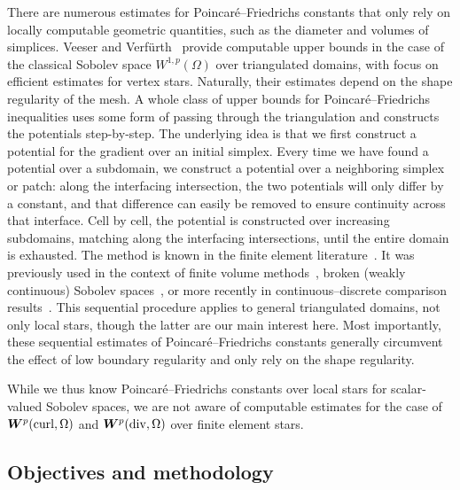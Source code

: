 \documentclass[10pt,a4paper]{article}
\begin{document}
There are numerous estimates for Poincar\'e--Friedrichs constants that only rely on locally computable geometric quantities, such as the diameter and volumes of simplices. 
Veeser and Verf\"urth~\cite{veeser2012poincare} provide computable upper bounds in the case of the classical Sobolev space $W^{1,p}(\Omega)$ over triangulated domains, with focus on efficient estimates for vertex stars. Naturally, their estimates depend on the shape regularity of the mesh.
A whole class of upper bounds for Poincar\'e--Friedrichs inequalities uses some form of passing through the triangulation and constructs the potentials step-by-step. 
The underlying idea is that we first construct a potential for the gradient over an initial simplex. 
Every time we have found a potential over a subdomain, we construct a potential over a neighboring simplex or patch:
along the interfacing intersection, the two potentials will only differ by a constant, 
and that difference can easily be removed to ensure continuity across that interface. 
Cell by cell, the potential is constructed over increasing subdomains, matching along the interfacing intersections, until the entire domain is exhausted.  
The method is known in the finite element literature~\cite{ern2021finite}. 
It was previously used in the context of finite volume methods~\cite{Eym_Gal_Her_00}, broken (weakly continuous) Sobolev spaces~\cite{vohralik2005discrete}, or more recently in continuous--discrete comparison results~\cite{Brae_Pill_Sch_p_rob_09, ern2020stable, Chaum_Voh_p_rob_3D_H_curl_24,  Voh_loc_glob_H1_24}. 
This sequential procedure applies to general triangulated domains, not only local stars, though the latter are our main interest here. 
Most importantly, these sequential estimates of Poincar\'e--Friedrichs constants generally circumvent the effect of low boundary regularity and only rely on the shape regularity. 

While we thus know Poincar\'e--Friedrichs constants over local stars for scalar-valued Sobolev spaces, 
we are not aware of computable estimates for the case of $\bm{W}^{p}(\operatorname{curl},\Omega)$ and $\bm{W}^{p}(\operatorname{div},\Omega)$ over finite element stars. 






\subsection{Objectives and methodology}
\end{document}
